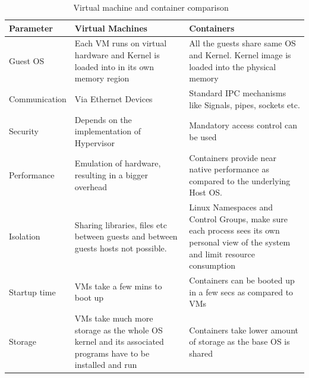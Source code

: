 \begin{table}[t]
     \caption[Virtual machine and container comparison]{Virtual machine and container comparison ~\cite{docker-vs-vm-table} } 
    \label{tab:docker-vs-vm}
    \centering
    
    \begin{tabular}{p{} p{} p{}}
       \toprule
        Parameter     & Virtual Machines  & Containers                                                                                \\ 
        \midrule
        Guest OS      & Each VM runs on virtual hardware and Kernel is loaded into in its
        own memory region                            & All the guests share same
        OS and Kernel. Kernel image is loaded into the physical memory  \\ \addlinespace 
        Communication & Via Ethernet Devices  & Standard IPC mechanisms like Signals, pipes, sockets etc.     \\ \addlinespace
        Security      & Depends on the implementation of Hypervisor   & Mandatory access control can be used   \\ \addlinespace
        Performance   & Emulation of hardware, resulting in a bigger overhead & Containers provide near native performance as compared to the underlying Host OS.         \\ \addlinespace
        Isolation     & Sharing libraries, files etc between guests and between guests hosts not possible.   & Linux Namespaces and Control Groups, make sure each process sees its own personal view of the system and limit resource consumption   \\ \addlinespace
        Startup time  & VMs take a few mins to boot up  & Containers can be booted up in a few secs as compared to VMs     \\ \addlinespace
        Storage       & VMs take much more storage as the whole OS kernel and its associated programs have to be installed and run     & Containers take lower amount of storage as the base OS is shared  \\                \bottomrule       
    \end{tabular}

   
\end{table}


